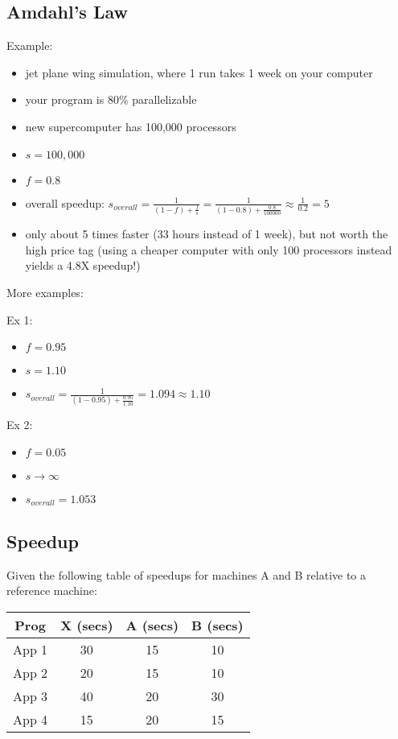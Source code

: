 \documentclass[12pt]{article}
\begin{document}
    \subsection{Amdahl's Law}

    Example:

	\begin{itemize}
		\item jet plane wing simulation, where 1 run takes 1 week on your computer
		\item your program is 80\% parallelizable
		\item new supercomputer has 100,000 processors
		\item $s = 100,000$
		\item $f = 0.8$
		\item overall speedup: $s_{overall} = \frac{1}{(1 - f) + \frac{f}{s}} = \frac{1}{(1 - 0.8) + \frac{0.8}{100000}} \approx \frac{1}{0.2} = 5$
		\item only about 5 times faster (33 hours instead of 1 week), but not worth the high price tag (using a cheaper computer with only 100 processors instead yields a 4.8X speedup!)
	\end{itemize}

	More examples:

	Ex 1:

	\begin{itemize}
		\item $f = 0.95$
		\item $s = 1.10$
		\item $s_{overall} = \frac{1}{(1-0.95) + \frac{0.95}{1.10}} = 1.094 \approx 1.10$
	\end{itemize}

	Ex 2:

	\begin{itemize}
		\item $f = 0.05$
		\item $s \rightarrow \infty$
		\item $s_{overall} = 1.053$
	\end{itemize}

    \subsection{Speedup}

    Given the following table of speedups for machines A and B relative to a reference machine:

	\begin{tabular}[h!]{|c|c|c|c|} \hline
		Prog	& X (secs)	& A (secs)	& B	(secs)	\\ \hline
		App 1	& 30		& 15		& 10		\\ \hline
		App 2	& 20		& 15		& 10		\\ \hline
		App 3	& 40		& 20		& 30		\\ \hline
		App 4	& 15		& 20		& 15		\\ \hline
	\end{tabular}
\end{document}
